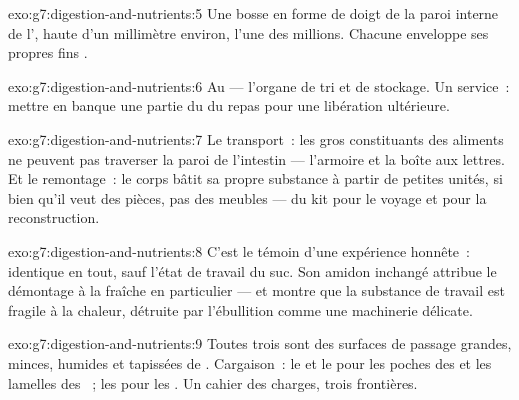 \begin{solution}{exo:g7:digestion-and-nutrients:5}
Une bosse en forme de doigt de la paroi interne de l',
haute d'un millimètre environ, l'une des millions. Chacune enveloppe
ses propres fins .
\end{solution}

\begin{solution}{exo:g7:digestion-and-nutrients:6}
Au  --- l'organe de tri et de stockage. Un service~: mettre en
banque une partie du  du repas pour une libération
ultérieure.
\end{solution}

\begin{solution}{exo:g7:digestion-and-nutrients:7}
Le transport~: les gros constituants des aliments ne peuvent pas
traverser la paroi de l'intestin --- l'armoire et la boîte aux
lettres. Et le remontage~: le corps bâtit sa propre substance à
partir de petites unités, si bien qu'il veut des pièces, pas des
meubles --- du kit pour le voyage et pour la reconstruction.
\end{solution}

\begin{solution}{exo:g7:digestion-and-nutrients:8}
C'est le témoin d'une expérience honnête~: identique en tout, sauf
l'état de travail du suc. Son amidon inchangé attribue le démontage
à la  fraîche en particulier --- et montre que la substance de
travail est fragile à la chaleur, détruite par l'ébullition comme
une machinerie délicate.
\end{solution}

\begin{solution}{exo:g7:digestion-and-nutrients:9}
Toutes trois sont des surfaces de passage grandes, minces, humides
et tapissées de . Cargaison~: le  et le  pour les poches des  et les lamelles des ~;
les  pour les . Un cahier des charges, trois
frontières.
\end{solution}

